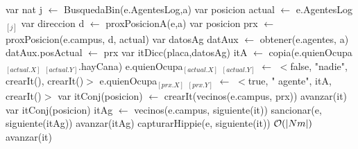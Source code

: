 \begin{algorithm}[H]
\begin{algorithmic}[1]
 
    \State var nat j $\gets$ BusquedaBin(e.AgentesLog,a) 
    \State var posicion actual $\gets$ e.AgentesLog$_{[j]}$ 
    \State var direccion d $\gets$ proxPosicionA(e,a) 
    \State var posicion prx $\gets$ proxPosicion(e.campus, d, actual) 
    \State var datosAg datAux $\gets$ obtener(e.agentes, a) 
    \State datAux.posActual $\gets$ prx 
    \State var itDicc(placa,datosAg) itA $\gets$ copia(e.quienOcupa$_{[actual.X]}$ $_{[actual.Y]}$.hayCana) 
    \State e.quienOcupa$_{[actual.X]}$ $_{[actual.Y]}$ $\gets$ $<$false, "nadie", crearIt(), crearIt()$>$ 
    \State e.quienOcupa$_{[prx.X]}$ $_{[prx.Y]}$ $\gets$ $<$true, " agente", itA, crearIt()$>$ 
    \State var itConj(posicion) $\gets$ crearIt(vecinos(e.campus, prx)) 
     
    		\State avanzar(it)
    	\Else
    		 
    			\State var itConj(posicion) itAg $\gets$ vecinos(e.campus, siguiente(it)) 
    			  
    				  
    					\State sancionar(e, siguiente(itAg))  
    				\EndIf
	    			\State avanzar(itAg)
    			\EndWhile
    		\Else
    			  
    				\State capturarHippie(e, siguiente(it))  \Comment $\mathcal{O}(\vert Nm \vert)$
    			\EndIf
    		\EndIf
    	\EndIf	
    	\State avanzar(it)
    \EndWhile
\EndFunction
\end{algorithmic}
\end{algorithm}